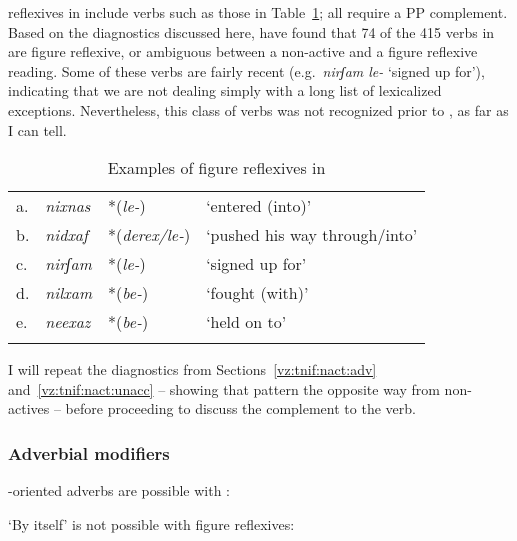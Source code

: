 \begin{exe}
\begin{xlist}
\begin{xlist}
\begin{exe}
\begin{xlist}
\begin{xlist}
\begin{exe}
\begin{xlist}
\begin{xlist}
\begin{exe}
\begin{exe}
\begin{xlist}
\begin{exe}
\begin{exe}
\begin{xlist}
 reflexives in {\tnif} include verbs such as those in Table~\ref{table:vz:figrefl}; all require a PP complement. Based on the diagnostics discussed here, \cite{ahdoutkastner19nels} have found that 74 of the 415 verbs in {\tnif} are figure reflexive, or ambiguous between a non-active and a figure reflexive reading. Some of these verbs are fairly recent (e.g.~\emph{nirʃam le-} `signed up for'), indicating that we are not dealing simply with a long list of lexicalized exceptions. Nevertheless, this class of verbs was not recognized prior to \cite{kastner16phd}, as far as I can tell.
\begin{table}
	\begin{tabularx}{.75\textwidth}{l>{\em}lll} 
 \lsptoprule
	a.& nixnas &  *(\emph{le-}) & `entered (into)'\\
	b.& nidxaf & *(\emph{derex/le-})  & `pushed his way through/into' \\
	c.& nirʃam & *(\emph{le-})  & `signed up for' \\
	d.& nilxam & *(\emph{be-}) & `fought (with)' \\
	e.& neexaz & *(\emph{be-}) & `held on to' \\
\lspbottomrule
     \end{tabularx}
	\caption{Examples of figure reflexives in {\tnif}}
\label{table:vz:figrefl}
\end{table}

I will repeat the diagnostics from Sections~\ref{vz:tnif:nact:adv} and~\ref{vz:tnif:nact:unacc} -- showing that  pattern the opposite way from non-actives -- before proceeding to discuss the complement to the verb.

		\subsubsection{Adverbial modifiers} \label{vz:tnif:figrefl:adv}
-oriented adverbs are possible with :
 \begin{exe}
	
 \z 

`By itself' is not possible with figure reflexives:
 \begin{exe}
 \z 


\end{exe}
\end{exe}
\end{xlist}
\end{exe}
\end{exe}
\end{xlist}
\end{exe}
\end{exe}
\end{xlist}
\end{xlist}
\end{exe}
\end{xlist}
\end{xlist}
\end{exe}
\end{xlist}
\end{xlist}
\end{exe}
